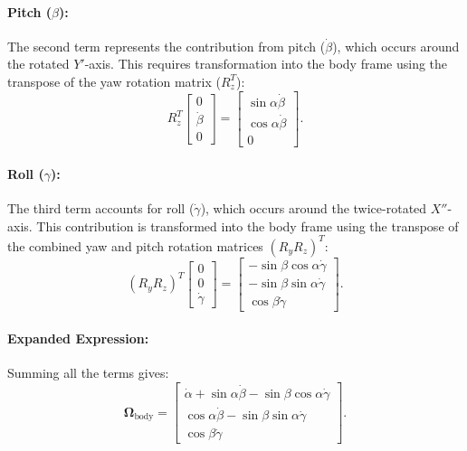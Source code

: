 \documentclass[12pt]{article}
\begin{document}
\paragraph{Pitch (\(\beta\)):}
The second term represents the contribution from pitch (\(\dot{\beta}\)), which occurs around the rotated \(Y'\)-axis. This requires transformation into the body frame using the transpose of the yaw rotation matrix (\(R_z^T\)):
\begin{equation}
\label{eq:omega_pitch}
R_z^T
\begin{bmatrix}
0 \\
\dot{\beta} \\
0
\end{bmatrix}
=
\begin{bmatrix}
\sin\alpha\dot{\beta} \\
\cos\alpha\dot{\beta} \\
0
\end{bmatrix}.
\end{equation}

\paragraph{Roll (\(\gamma\)):}
The third term accounts for roll (\(\dot{\gamma}\)), which occurs around the twice-rotated \(X''\)-axis. This contribution is transformed into the body frame using the transpose of the combined yaw and pitch rotation matrices \((R_y R_z)^T\):
\begin{equation}
\label{eq:omega_roll}
(R_y R_z)^T
\begin{bmatrix}
0 \\
0 \\
\dot{\gamma}
\end{bmatrix}
=
\begin{bmatrix}
-\sin\beta\cos\alpha\dot{\gamma} \\
-\sin\beta\sin\alpha\dot{\gamma} \\
\cos\beta\dot{\gamma}
\end{bmatrix}.
\end{equation}

\paragraph{Expanded Expression:}
Summing all the terms gives:
\begin{equation}
\label{eq:omega_body_expanded}
\boldsymbol{\Omega}_{\text{body}} =
\begin{bmatrix}
\dot{\alpha} + \sin\alpha\dot{\beta} - \sin\beta\cos\alpha\dot{\gamma} \\
\cos\alpha\dot{\beta} - \sin\beta\sin\alpha\dot{\gamma} \\
\cos\beta\dot{\gamma}
\end{bmatrix}.
\end{equation}
\end{document}
